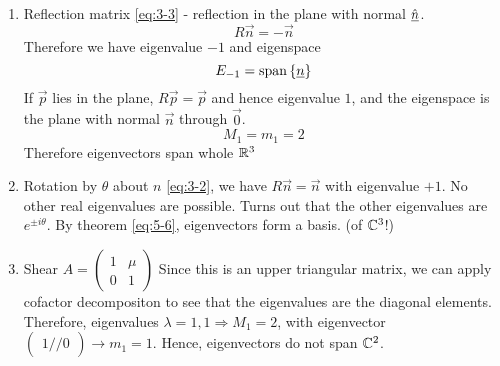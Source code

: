 \documentclass{article}
\numberwithin{equation}{section}
\begin{document}
\begin{eg}
\begin{enumerate}
        
        \item Reflection matrix \eqref{eq:3-3} - reflection in the plane with normal $\hat{\underline{n}}$.
        \[
            R\vec n = - \vec n
        \]
        Therefore we have eigenvalue $-1$ and eigenspace
        \[
            E_{-1} = \operatorname{span} \left\{ \underline{n} \right\}
        \]
        If $\vec p$ lies in the plane, $R\vec p = \vec p$ and hence eigenvalue $1$,
        and the eigenspace is the plane with normal $\vec n$ through $\vec 0$.
        \[
            M_{1} = m_{1} = 2
        \]
        Therefore eigenvectors span whole $\mathbb{R}^3$

        \item Rotation by $\theta$ about $n$ \eqref{eq:3-2}, we have $R \vec n = \vec n$ with eigenvalue $+1$.
        No other real eigenvalues are possible. Turns out that the other eigenvalues are $e^{\pm i \theta}$.
        By theorem \eqref{eq:5-6}, eigenvectors form a basis. (of $\mathbb{C}^3$!)

        \item Shear $A = \begin{pmatrix}
            1 & \mu \\
            0 & 1
        \end{pmatrix}$
        Since this is an upper triangular matrix, we can apply cofactor decompositon to see that the eigenvalues are the diagonal elements.
        Therefore, eigenvalues $\lambda = 1, 1 \Rightarrow M_1 = 2$, with eigenvector $\begin{pmatrix}
            1 // 0
        \end{pmatrix} \rightarrow m_1 = 1$.
        Hence, eigenvectors do not span $\mathbb{C}^2$.
    \end{enumerate}
\end{eg}
\end{document}
